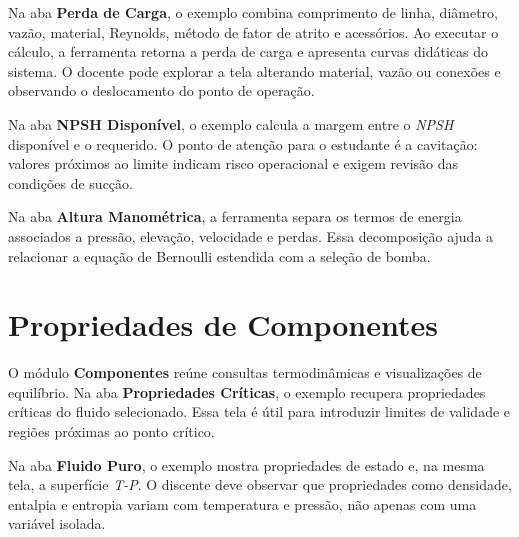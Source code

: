 Na aba \textbf{Perda de Carga}, o exemplo combina comprimento de linha, diâmetro, vazão, material, Reynolds, método de fator de atrito e acessórios. Ao executar o cálculo, a ferramenta retorna a perda de carga e apresenta curvas didáticas do sistema. O docente pode explorar a tela alterando material, vazão ou conexões e observando o deslocamento do ponto de operação.


Na aba \textbf{NPSH Disponível}, o exemplo calcula a margem entre o \textit{NPSH} disponível e o requerido. O ponto de atenção para o estudante é a cavitação: valores próximos ao limite indicam risco operacional e exigem revisão das condições de sucção.


Na aba \textbf{Altura Manométrica}, a ferramenta separa os termos de energia associados a pressão, elevação, velocidade e perdas. Essa decomposição ajuda a relacionar a equação de Bernoulli estendida com a seleção de bomba.


\section{Propriedades de Componentes}

O módulo \textbf{Componentes} reúne consultas termodinâmicas e visualizações de equilíbrio. Na aba \textbf{Propriedades Críticas}, o exemplo recupera propriedades críticas do fluido selecionado. Essa tela é útil para introduzir limites de validade e regiões próximas ao ponto crítico.


Na aba \textbf{Fluido Puro}, o exemplo mostra propriedades de estado e, na mesma tela, a superfície \textit{T-P}. O discente deve observar que propriedades como densidade, entalpia e entropia variam com temperatura e pressão, não apenas com uma variável isolada.


